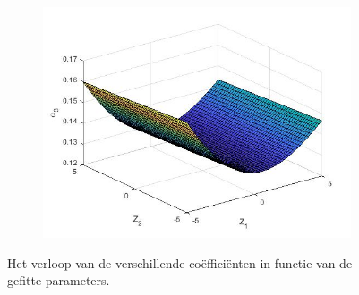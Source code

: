 \documentclass[12pt]{article}
\begin{document}
\begin{figure}[H]
\begin{subfigure}{0.49\textwidth}
\end{subfigure}
\begin{subfigure}{0.49\textwidth}
\includegraphics[width=0.9\linewidth]{alpha3_s3.jpg}
\end{subfigure}
\caption{Het verloop van de verschillende coëfficiënten in functie van de gefitte parameters.}
\label{fig:coefgraphss3}
\end{figure}
\end{document}
